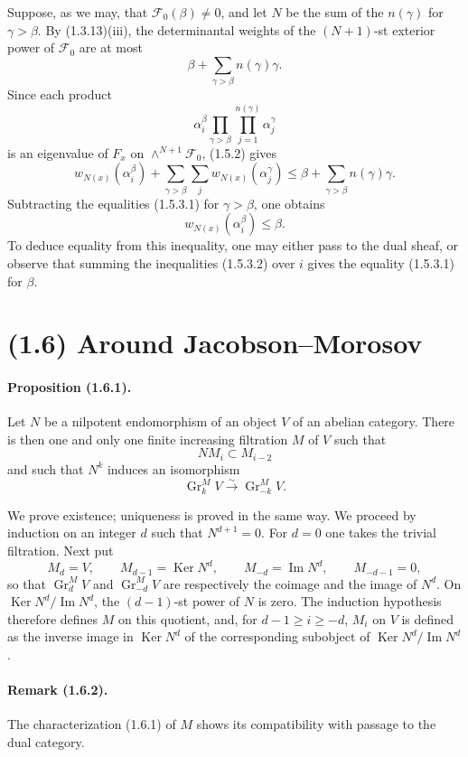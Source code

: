 \documentclass[11pt]{article}
\theoremstyle{remark}
\newcommand{\Gr}{\operatorname{Gr}}
\newcommand{\Ker}{\operatorname{Ker}}
\newcommand{\Image}{\operatorname{Im}}
\begin{document}
Suppose, as we may, that $\mathcal F_0(\beta)\ne0$, and let $N$ be the sum of the $n(\gamma)$ for $\gamma>\beta$. By (1.3.13)(iii), the determinantal weights of the $(N+1)$-st exterior power of $\mathcal F_0$ are at most
\[
\beta+\sum_{\gamma>\beta}n(\gamma)\gamma.
\]
Since each product
\[
\alpha_i^\beta\prod_{\gamma>\beta}\prod_{j=1}^{n(\gamma)}\alpha_j^\gamma
\]
is an eigenvalue of $F_x$ on $\wedge^{N+1}\mathcal F_0$, (1.5.2) gives
\[
w_{N(x)}(\alpha_i^\beta)+\sum_{\gamma>\beta}\sum_j w_{N(x)}(\alpha_j^\gamma)
\le
\beta+\sum_{\gamma>\beta}n(\gamma)\gamma.
\]
Subtracting the equalities (1.5.3.1) for $\gamma>\beta$, one obtains
\begin{equation}\tag{1.5.3.2}
w_{N(x)}(\alpha_i^\beta)\le \beta.
\end{equation}
To deduce equality from this inequality, one may either pass to the dual sheaf, or observe that summing the inequalities (1.5.3.2) over $i$ gives the equality (1.5.3.1) for $\beta$.



\section*{(1.6) Around Jacobson--Morosov}

\paragraph{Proposition (1.6.1).}
Let $N$ be a nilpotent endomorphism of an object $V$ of an abelian category. There is then one and only one finite increasing filtration $M$ of $V$ such that
\[
N M_i\subset M_{i-2}
\]
and such that $N^k$ induces an isomorphism
\[
\Gr^M_k V\xrightarrow{\sim}\Gr^M_{-k}V.
\]

We prove existence; uniqueness is proved in the same way. We proceed by induction on an integer $d$ such that $N^{d+1}=0$. For $d=0$ one takes the trivial filtration. Next put
\[
M_d=V,
\qquad
M_{d-1}=\Ker N^d,
\qquad
M_{-d}=\Image N^d,
\qquad
M_{-d-1}=0,
\]
so that $\Gr^M_d V$ and $\Gr^M_{-d}V$ are respectively the coimage and the image of $N^d$. On $\Ker N^d/\Image N^d$, the $(d-1)$-st power of $N$ is zero. The induction hypothesis therefore defines $M$ on this quotient, and, for $d-1\ge i\ge -d$, $M_i$ on $V$ is defined as the inverse image in $\Ker N^d$ of the corresponding subobject of $\Ker N^d/\Image N^d$.

\paragraph{Remark (1.6.2).}
The characterization (1.6.1) of $M$ shows its compatibility with passage to the dual category.
\end{document}
